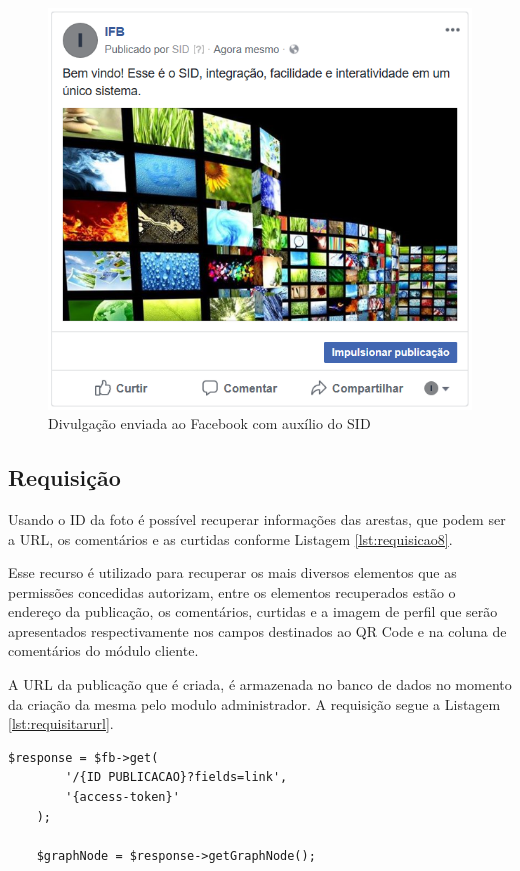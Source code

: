 \begin{figure}[H]
\centering
\includegraphics[scale=0.8]{figuras/imgfacebook1}
\caption{Divulgação enviada ao Facebook com auxílio do SID}
\label{fig:imgfacebook1}
\end{figure}


\subsection{Requisição}
Usando o ID da foto é possível recuperar informações das arestas, que podem ser a URL, os comentários e as curtidas conforme Listagem \ref{lst:requisicao8}. 

Esse recurso é utilizado para recuperar os mais diversos elementos que as permissões concedidas autorizam, entre os elementos recuperados estão o endereço da publicação, os comentários, curtidas e a imagem de perfil que serão apresentados respectivamente nos campos destinados ao QR Code e na coluna de comentários do módulo cliente.

A URL da publicação que é criada, é armazenada no banco de dados no momento da criação da mesma pelo modulo administrador. A requisição segue a Listagem \ref{lst:requisitarurl}.

\begin{lstlisting}[caption={Foto de usuário},label={lst:requisitarurl}]
  	$response = $fb->get(
    	'/{ID PUBLICACAO}?fields=link',
		'{access-token}'
	);
	
	$graphNode = $response->getGraphNode();
\end{lstlisting}

